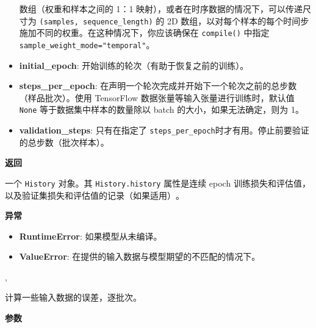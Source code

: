 \begin{itemize}
  数组（权重和样本之间的 1：1
  映射），或者在时序数据的情况下，可以传递尺寸为
  \texttt{(samples,\ sequence\_length)} 的 2D
  数组，以对每个样本的每个时间步施加不同的权重。在这种情况下，你应该确保在
  \texttt{compile()} 中指定 \texttt{sample\_weight\_mode="temporal"}。
\item
  \textbf{initial\_epoch}: 开始训练的轮次（有助于恢复之前的训练）。
\item
  \textbf{steps\_per\_epoch}:
  在声明一个轮次完成并开始下一个轮次之前的总步数（样品批次）。使用
  TensorFlow 数据张量等输入张量进行训练时，默认值 \texttt{None}
  等于数据集中样本的数量除以 batch 的大小，如果无法确定，则为 1。
\item
  \textbf{validation\_steps}: 只有在指定了
  \texttt{steps\_per\_epoch}时才有用。停止前要验证的总步数（批次样本）。
\end{itemize}

\textbf{返回}

一个 \texttt{History} 对象。其 \texttt{History.history} 属性是连续 epoch
训练损失和评估值，以及验证集损失和评估值的记录（如果适用）​​。

\textbf{异常}

\begin{itemize}
\tightlist
\item
  \textbf{RuntimeError}: 如果模型从未编译。
\item
  \textbf{ValueError}: 在提供的输入数据与模型期望的不匹配的情况下。
\end{itemize}



\label{evaluate}

\begin{Shaded}
\begin{Highlighting}[]
\OperatorTok{=}\OperatorTok{=}\OperatorTok{=}\OperatorTok{=}\OperatorTok{=}, \\
\hspace{2cm}\OperatorTok{=}\NormalTok{)}
\end{Highlighting}
\end{Shaded}

计算一些输入数据的误差，逐批次。

\textbf{参数}

